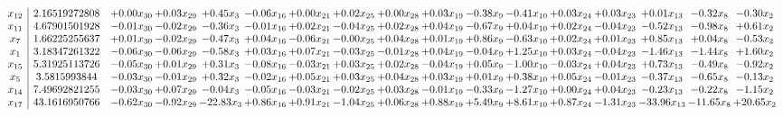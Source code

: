\documentclass[9pt]{article}
\begin{document}
 \[\begin{array}{c| c c@{\hskip 2pt} c@{\hskip 2pt} c@{\hskip 2pt} c@{\hskip 2pt} c@{\hskip 2pt} c@{\hskip 2pt} c@{\hskip 2pt} c@{\hskip 2pt} c@{\hskip 2pt} c@{\hskip 2pt} c@{\hskip 2pt} c@{\hskip 2pt} c@{\hskip 2pt} c@{\hskip 2pt} c@{\hskip 2pt} }
 x_{12}   &  2.16519272808 & +  0.00 x_{30} & +  0.03 x_{29} & +  0.45 x_{3} & -0.06 x_{16} & +  0.00 x_{21} & +  0.02 x_{25} & +  0.00 x_{28} & +  0.03 x_{19} & -0.38 x_{9} & -0.41 x_{10} & +  0.03 x_{24} & +  0.03 x_{23} & +  0.01 x_{13} & -0.32 x_{8} & -0.30 x_{2}\\
 x_{11}   &  4.67901501928 & -0.01 x_{30} & -0.02 x_{29} & -0.36 x_{3} & -0.01 x_{16} & +  0.02 x_{21} & -0.04 x_{25} & +  0.02 x_{28} & +  0.04 x_{19} & -0.67 x_{9} & +  0.04 x_{10} & +  0.02 x_{24} & -0.04 x_{23} & -0.52 x_{13} & -0.98 x_{8} & +  0.61 x_{2}\\
 x_{7}   &  1.66225255637 & +  0.01 x_{30} & -0.02 x_{29} & -0.47 x_{3} & +  0.04 x_{16} & -0.06 x_{21} & -0.00 x_{25} & +  0.04 x_{28} & +  0.01 x_{19} & +  0.86 x_{9} & -0.63 x_{10} & +  0.02 x_{24} & +  0.01 x_{23} & +  0.85 x_{13} & +  0.04 x_{8} & -0.53 x_{2}\\
 x_{1}   &  3.18347261322 & -0.06 x_{30} & -0.06 x_{29} & -0.58 x_{3} & +  0.03 x_{16} & +  0.07 x_{21} & -0.03 x_{25} & -0.01 x_{28} & +  0.04 x_{19} & -0.04 x_{9} & +  1.25 x_{10} & +  0.03 x_{24} & -0.04 x_{23} & -1.46 x_{13} & -1.44 x_{8} & +  1.60 x_{2}\\
 x_{15}   &  5.31925113726 & -0.05 x_{30} & +  0.01 x_{29} & +  0.31 x_{3} & -0.08 x_{16} & -0.03 x_{21} & +  0.03 x_{25} & +  0.02 x_{28} & -0.04 x_{19} & +  0.05 x_{9} & -1.00 x_{10} & -0.03 x_{24} & +  0.04 x_{23} & +  0.73 x_{13} & -0.49 x_{8} & -0.92 x_{2}\\
 x_{5}   &  3.5815993844 & -0.03 x_{30} & -0.01 x_{29} & +  0.32 x_{3} & -0.02 x_{16} & +  0.05 x_{21} & +  0.03 x_{25} & +  0.04 x_{28} & +  0.03 x_{19} & +  0.01 x_{9} & +  0.38 x_{10} & +  0.05 x_{24} & -0.01 x_{23} & -0.37 x_{13} & -0.65 x_{8} & -0.13 x_{2}\\
 x_{14}   &  7.49692821255 & -0.03 x_{30} & +  0.07 x_{29} & -0.04 x_{3} & -0.05 x_{16} & -0.03 x_{21} & -0.02 x_{25} & +  0.03 x_{28} & -0.01 x_{19} & -0.33 x_{9} & -1.27 x_{10} & +  0.00 x_{24} & +  0.04 x_{23} & -0.23 x_{13} & -0.22 x_{8} & -1.15 x_{2}\\
 x_{17}   &  43.1616950766 & -0.62 x_{30} & -0.92 x_{29} & -22.83 x_{3} & +  0.86 x_{16} & +  0.91 x_{21} & -1.04 x_{25} & +  0.06 x_{28} & +  0.88 x_{19} & +  5.49 x_{9} & +  8.61 x_{10} & +  0.87 x_{24} & -1.31 x_{23} & -33.96 x_{13} & -11.65 x_{8} & + 20.65 x_{2}\\

\end{array}\]
\end{document}
